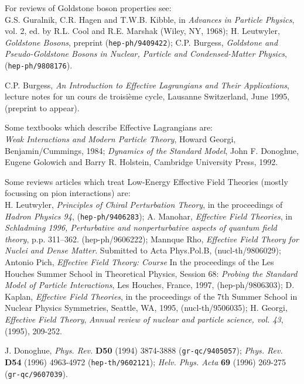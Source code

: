 \begin{thebibliography}{99}
For reviews of Goldstone boson properties see:\\
G.S. Guralnik, C.R. Hagen and T.W.B. Kibble, 
in {\it Advances in Particle Physics}, vol. 2, ed. by R.L. Cool 
and R.E. Marshak (Wiley, NY, 1968);
H. Leutwyler, {\sl Goldstone Bosons}, preprint ({\tt hep-ph/9409422});
C.P. Burgess, {\sl Goldstone and Pseudo-Goldstone Bosons in 
Nuclear, Particle and Condensed-Matter Physics}, ({\tt hep-ph/9808176}).

C.P. Burgess, {\sl An Introduction to Effective Lagrangians 
and Their Applications}, lecture notes for un cours de
troisi\`eme cycle, Lausanne Switzerland, June 1995,
(preprint to appear).

Some textbooks which describe Effective Lagrangians are:\\
{\it Weak Interactions and Modern Particle Theory}, Howard Georgi,
Benjamin/Cummings, 1984;
{\it Dynamics of the Standard Model}, 
John F. Donoghue, Eugene Golowich and
Barry R. Holstein, Cambridge University Press, 1992.

Some reviews articles which treat Low-Energy Effective Field
Theories (mostly focussing on pion interactions) are:\\
H. Leutwyler, {\sl Principles of Chiral Perturbation Theory},
in the proceedings of {\it Hadron Physics 94}, ({\tt hep-ph/9406283});
A. Manohar, {\sl Effective Field Theories},  in {\it Schladming 1996,
Perturbative and nonperturbative  aspects of quantum field theory}, p.p.
311--362. (hep-ph/9606222);
Mannque Rho, {\sl Effective Field Theory for Nuclei and Dense Matter}.
Submitted to Acta Phys.Pol.B, (nucl-th/9806029);
Antonio Pich, {\sl Effective Field Theory: Course} In the proceedings of the
Les Houches Summer School in Theoretical Physics,
Session 68: {\it Probing the Standard Model of Particle Interactions},
Les Houches, France, 1997, (hep-ph/9806303);
D. Kaplan, {\sl Effective Field Theories}, in the proceedings of the 7th Summer
School in Nuclear Physics
Symmetries, Seattle, WA, 1995, (nucl-th/9506035);
H. Georgi, {\sl Effective Field Theory},
{\it Annual review of nuclear and particle science, vol. 43},
(1995), 209-252.

J. Donoghue, {\it Phys. Rev.} {\bf D50} (1994) 3874-3888 
({\tt gr-qc/9405057});
{\it Phys. Rev.} {\bf D54} (1996) 4963-4972 ({\tt hep-th/9602121}); 
{\it Helv. Phys. Acta} {\bf  69} (1996) 269-275
({\tt gr-qc/9607039}). 

\end{thebibliography}



